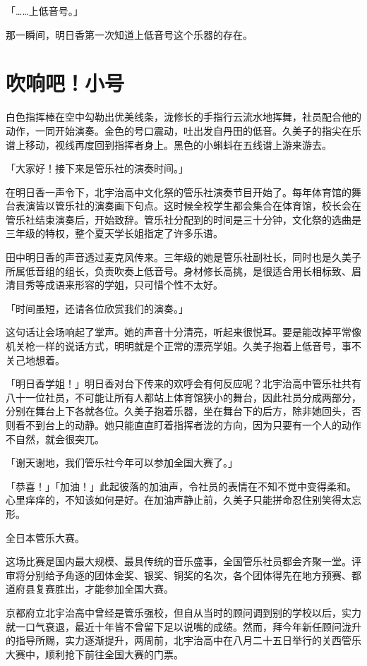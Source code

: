\documentclass[UTF8]{ctexart}
\begin{document}
    「……上低音号。」 

    那一瞬间，明日香第一次知道上低音号这个乐器的存在。   

    \setcounter{secnumdepth}{3}
    \section{吹响吧！小号}
    白色指挥棒在空中勾勒出优美线条，泷修长的手指行云流水地挥舞，社员配合他的动作，一同开始演奏。金色的号口震动，吐出发自丹田的低音。久美子的指尖在乐谱上移动，视线再度回到指挥者身上。黑色的小蝌蚪在五线谱上游来游去。 

    「大家好！接下来是管乐社的演奏时间。」 

    在明日香一声令下，北宇治高中文化祭的管乐社演奏节目开始了。每年体育馆的舞台表演皆以管乐社的演奏画下句点。这时候全校学生都会集合在体育馆，校长会在管乐社结束演奏后，开始致辞。管乐社分配到的时间是三十分钟，文化祭的选曲是三年级的特权，整个夏天学长姐指定了许多乐谱。 

    田中明日香的声音透过麦克风传来。三年级的她是管乐社副社长，同时也是久美子所属低音组的组长，负责吹奏上低音号。身材修长高挑，是很适合用长相标致、眉清目秀等成语来形容的学姐，只可惜个性不太好。 

    「时间虽短，还请各位欣赏我们的演奏。」 

    这句话让会场响起了掌声。她的声音十分清亮，听起来很悦耳。要是能改掉平常像机关枪一样的说话方式，明明就是个正常的漂亮学姐。久美子抱着上低音号，事不关己地想着。 

    「明日香学姐！」明日香对台下传来的欢呼会有何反应呢？北宇治高中管乐社共有八十一位社员，不可能让所有人都站上体育馆狭小的舞台，因此社员分成两部分，分别在舞台上下各就各位。久美子抱着乐器，坐在舞台下的后方，除非她回头，否则看不到台上的动静。她只能直直盯着指挥者泷的方向，因为只要有一个人的动作不自然，就会很突兀。 

    「谢天谢地，我们管乐社今年可以参加全国大赛了。」 

    「恭喜！」「加油！」此起彼落的加油声，令社员的表情在不知不觉中变得柔和。心里痒痒的，不知该如何是好。在加油声静止前，久美子只能拼命忍住别笑得太忘形。 

    全日本管乐大赛。 

    这场比赛是国内最大规模、最具传统的音乐盛事，全国管乐社员都会齐聚一堂。评审将分别给予角逐的团体金奖、银奖、铜奖的名次，各个团体得先在地方预赛、都道府县复赛胜出，才能参加全国大赛。 

    京都府立北宇治高中曾经是管乐强校，但自从当时的顾问调到别的学校以后，实力就一口气衰退，最近十年皆不曾留下足以说嘴的成绩。然而，拜今年新任顾问泷升的指导所赐，实力逐渐提升，两周前，北宇治高中在八月二十五日举行的关西管乐大赛中，顺利抢下前往全国大赛的门票。 
\end{document}
